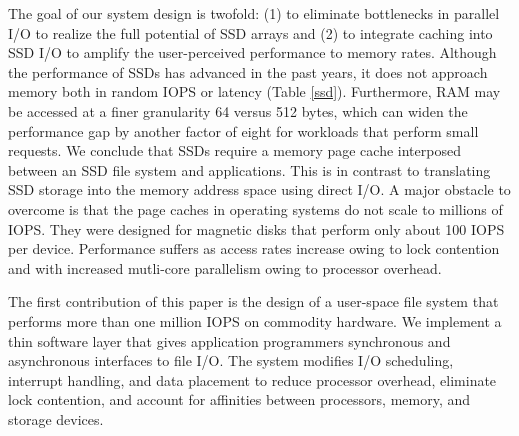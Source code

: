 The goal of our system design is twofold: (1) to eliminate bottlenecks in parallel I/O 
to realize the full potential of SSD arrays and (2) to integrate caching into SSD I/O to amplify the 
user-perceived performance to memory rates.  
Although the performance of SSDs has advanced in the past years, it
does not approach memory both in random IOPS or latency (Table \ref{ssd}). 
Furthermore, RAM may be accessed at a finer granularity 64 versus 512 bytes, which can widen the performance gap 
by another factor of eight for workloads that perform small requests.
We conclude that SSDs require a memory page cache interposed between an SSD file system and applications.
This is in contrast to translating SSD storage into the memory address space using direct I/O. %
A major obstacle to overcome is that the page caches in operating systems do not scale to millions of IOPS.
They were designed for magnetic disks that perform only about 100 IOPS per device.
Performance suffers as access rates increase owing to lock contention 
and with increased mutli-core parallelism owing to processor overhead.






The first contribution of this paper is the design of a user-space file system that
performs more than one million IOPS on commodity hardware.   We implement a thin software
layer that gives application programmers synchronous and asynchronous interfaces to 
file I/O.  The system modifies I/O scheduling, interrupt handling, and data placement
to reduce processor overhead, eliminate lock contention, 
and account for affinities between processors, memory, and storage devices.

